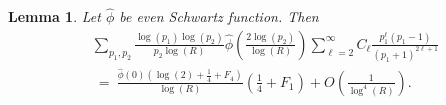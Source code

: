 \documentclass[11pt, reqno]{amsart}
\newtheorem{lemma}[theorem]{Lemma}
\theoremstyle{definition}
\theoremstyle{remark}
\numberwithin{equation}{section}
\renewcommand{\hat}{\widehat}
\begin{document}
\begin{lemma}
     Let $\hat\phi$ be even Schwartz function. Then
    \begin{equation}
        \begin{aligned}
        & \sum_{p_1,p_2} \frac{\log(p_1)\log(p_2)}{p_2\log(R)}\hat\phi\left(\frac{2\log(p_2)}{\log(R)}\right) \sum_{\ell=2}^\infty C_\ell \frac{p_1^\ell(p_1-1)}{(p_1+1)^{2\ell +1}}\\
        & \ = \ \frac{\hat\phi(0)(\log(2)+\frac{1}{4}+F_4)}{\log(R)}\left(\frac{1}{4}+F_1\right)+O\left(\frac{1}{\log^4(R)}\right). 
    \end{aligned}
\end{equation}
\end{lemma}
\end{document}
